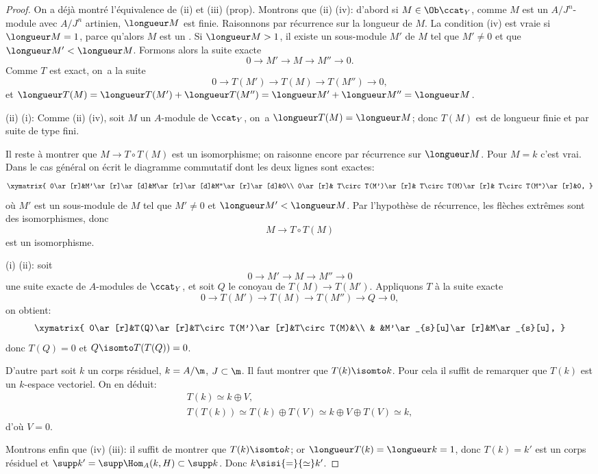 \begin{proof}
On a d\'ej\`a montr\'e l'\'equivalence de (ii) et (iii) (prop\ptbl {}). Montrons que (ii)  (iv): d'abord si $M\in \Ob \ccat_{Y}$, comme $M$ est un $A/J^{n}$-module avec $A/J^{n}$ artinien, $\longueur M$ est finie. Raisonnons par r\'ecurrence sur la longueur de $M$. La condition (iv) est vraie si $\longueur M=1$, parce qu'alors $M$ est un . Si $\longueur M>1$, il existe un sous-module $M'$ de $M$ tel que $M'\neq 0$ et que $\longueur M'<\longueur M$. Formons alors la suite exacte
$$
0\to M'\to M\to M''\to 0.
$$
Comme $T$ est exact, on~a la suite
$$
0\to T(M')\to T(M)\to T(M'')\to 0,
$$
et $\longueur T(M)=\longueur T(M')+\longueur T(M'')=\longueur M'+\longueur M''=\longueur M$.

(ii)  (i): Comme (ii)  (iv), soit $M$ un $A$-module de $\ccat_{Y}$, on~a $\longueur T(M)=\longueur M$; donc $T(M)$ est de longueur finie et par suite de type fini.

Il reste \`a montrer que $M\to T\circ T(M)$ est un isomorphisme; on raisonne encore par r\'ecurrence sur $\longueur M$. Pour $M=k$ c'est vrai. Dans le cas g\'en\'eral on \'ecrit le diagramme commutatif dont les deux lignes sont exactes\pageoriginaled:
$$
\xymatrix{ 0\ar[r]&M'\ar[r]\ar[d]&M\ar[r]\ar[d]&M''\ar[r]\ar[d]&0\\
0\ar[r]& T\circ T(M')\ar[r]& T\circ T(M)\ar[r]& T\circ T(M'')\ar[r]&0, }
$$
o\`u $M'$ est un sous-module de $M$ tel que $M'\neq 0$ et $\longueur M'<\longueur M$. Par l'hypoth\`ese de r\'ecurrence, les fl\`eches extr\^emes sont des isomorphismes, donc
$$
M\to T\circ T(M)
$$
est un isomorphisme.

(i)  (ii): soit
$$
0\to M'\to M\to M''\to 0
$$
une suite exacte de $A$-modules de $\ccat_{Y}$, et soit $Q$ le conoyau de $T(M)\to T(M')$. Appliquons $T$ \`a la suite exacte
$$
0\to T(M')\to T(M)\to T(M'')\to Q \to 0,
$$
on obtient:
$$
\xymatrix{
0\ar[r]&T(Q)\ar[r]&T\circ T(M')\ar[r]&T\circ T(M)&\\
& &M'\ar_{s}[u]\ar[r]&M\ar_{s}[u],
}
$$
donc $T(Q)=0$ et $Q\isomto T(T(Q))=0$.

D'autre part soit $k$ un corps r\'esiduel, $k=A/\m$, $J\subset \m$. Il faut montrer que $T(k)\isomto k$. Pour cela il suffit de remarquer que $T(k)$ est un $k$-espace vectoriel. On en d\'eduit:
\begin{gather*}
T(k)\simeq k\oplus V,\\
T(T(k))\simeq T(k)\oplus T(V)\simeq k\oplus V\oplus T(V)\simeq k,
\end{gather*}
d'o\`u $V=0$.

Montrons enfin que (iv)  (iii): il suffit de montrer que $T(k)\isomto k$; or $\longueur T(k)= \longueur k=1$, donc $T(k)=k'$ est un corps r\'esiduel et $\supp k'= \supp \Hom_{A}(k, H)\subset \supp k$. Donc $k\sisi{=}{\simeq}k'$.
\skipqed
\end{proof}

